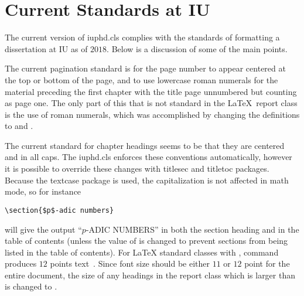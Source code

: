 \section{Current Standards at IU}
The current version of iuphd.cls complies with the standards of formatting a dissertation at IU as of $2018$.  Below is a discussion of
some of the main points.

The current pagination standard is for the page number to appear centered at the top or bottom of the
page, and to use lowercase roman numerals for the material preceding the first chapter with the title page unnumbered but counting as
page one. The only part of this that is not standard in the \LaTeX \ report class is the use of roman numerals, which was accomplished
by changing the definitions to  and .

The current standard for chapter headings seems to be that they are centered and in all caps.  The iuphd.cls enforces these
conventions automatically, however it is possible to override these changes with
titlesec and titletoc packages. Because the textcase package is used,
the capitalization is not affected in math mode, so for instance
\begin{verbatim}
\section{$p$-adic numbers}
\end{verbatim}
will give the output ``$p$-ADIC NUMBERS'' in both the section heading and in the table of contents
(unless the value of  is changed to prevent sections from being listed in the table of contents).
For LaTeX standard classes with \code{[11pt]},  command produces
$12$ points text~\cite{wiki:LaTeXFonts}. Since font size should be either $11$
or $12$ point for the entire document, the size of any headings in the report class
which is larger than  is changed to .

